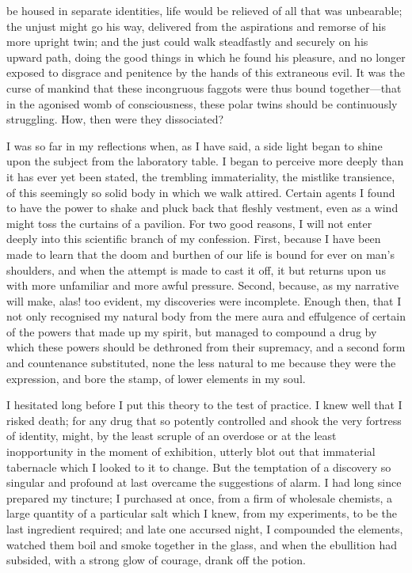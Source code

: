 \documentclass[12pt,openright]{book}
\begin{document}
be housed in separate identities, life would be relieved of all that was unbearable; the unjust might go his way, delivered from the aspirations and remorse of his more upright twin; and the just could walk steadfastly and securely on his upward path, doing the good things in which he found his pleasure, and no longer exposed to disgrace and penitence by the hands of this extraneous evil. It was the curse of mankind that these incongruous faggots were thus bound together—that in the agonised womb of consciousness, these polar twins should be continuously struggling. How, then were they dissociated?

I was so far in my reflections when, as I have said, a side light began to shine upon the subject from the laboratory table. I began to perceive more deeply than it has ever yet been stated, the trembling immateriality, the mistlike transience, of this seemingly so solid body in which we walk attired. Certain agents I found to have the power to shake and pluck back that fleshly vestment, even as a wind might toss the curtains of a pavilion. For two good reasons, I will not enter deeply into this scientific branch of my confession. First, because I have been made to learn that the doom and burthen of our life is bound for ever on man’s shoulders, and when the attempt is made to cast it off, it but returns upon us with more unfamiliar and more awful pressure. Second, because, as my narrative will make, alas! too evident, my discoveries were incomplete. Enough then, that I not only recognised my natural body from the mere aura and effulgence of certain of the powers that made up my spirit, but managed to compound a drug by which these powers should be dethroned from their supremacy, and a second form and countenance substituted, none the less natural to me because they were the expression, and bore the stamp, of lower elements in my soul.

I hesitated long before I put this theory to the test of practice. I knew well that I risked death; for any drug that so potently controlled and shook the very fortress of identity, might, by the least scruple of an overdose or at the least inopportunity in the moment of exhibition, utterly blot out that immaterial tabernacle which I looked to it to change. But the temptation of a discovery so singular and profound at last overcame the suggestions of alarm. I had long since prepared my tincture; I purchased at once, from a firm of wholesale chemists, a large quantity of a particular salt which I knew, from my experiments, to be the last ingredient required; and late one accursed night, I compounded the elements, watched them boil and smoke together in the glass, and when the ebullition had subsided, with a strong glow of courage, drank off the potion.
\end{document}
